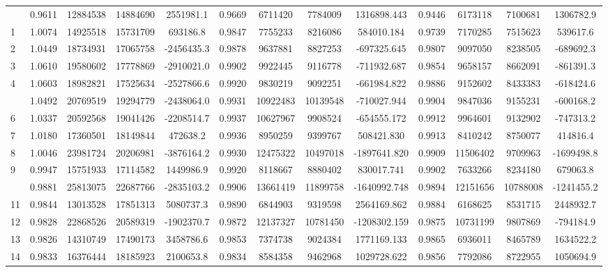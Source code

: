 \documentclass[
  12pt,
]{article}
\begin{document}
\begin{longtable}[t]{lcccccccccccc}
\endfoot
\bottomrule
\endlastfoot
0 & 0.9611 & 12884538 & 14884690 & 2551981.1 & 0.9669 & 6711420 & 7784009 & 1316898.443 & 0.9446 & 6173118 & 7100681 & 1306782.9\\
1 & 1.0074 & 14925518 & 15731709 & 693186.8 & 0.9847 & 7755233 & 8216086 & 584010.184 & 0.9739 & 7170285 & 7515623 & 539617.6\\
2 & 1.0449 & 18734931 & 17065758 & -2456435.3 & 0.9878 & 9637881 & 8827253 & -697325.645 & 0.9807 & 9097050 & 8238505 & -689692.3\\
3 & 1.0610 & 19580602 & 17778869 & -2910021.0 & 0.9902 & 9922445 & 9116778 & -711932.687 & 0.9854 & 9658157 & 8662091 & -861391.3\\
4 & 1.0603 & 18982821 & 17525634 & -2527866.6 & 0.9920 & 9830219 & 9092251 & -661984.822 & 0.9886 & 9152602 & 8433383 & -618424.6\\
\addlinespace
5 & 1.0492 & 20769519 & 19294779 & -2438064.0 & 0.9931 & 10922483 & 10139548 & -710027.944 & 0.9904 & 9847036 & 9155231 & -600168.2\\
6 & 1.0337 & 20592568 & 19041426 & -2208514.7 & 0.9937 & 10627967 & 9908524 & -654555.172 & 0.9912 & 9964601 & 9132902 & -747313.2\\
7 & 1.0180 & 17360501 & 18149844 & 472638.2 & 0.9936 & 8950259 & 9399767 & 508421.830 & 0.9913 & 8410242 & 8750077 & 414816.4\\
8 & 1.0046 & 23981724 & 20206981 & -3876164.2 & 0.9930 & 12475322 & 10497018 & -1897641.820 & 0.9909 & 11506402 & 9709963 & -1699498.8\\
9 & 0.9947 & 15751933 & 17114582 & 1449986.9 & 0.9920 & 8118667 & 8880402 & 830017.741 & 0.9902 & 7633266 & 8234180 & 679063.8\\
\addlinespace
10 & 0.9881 & 25813075 & 22687766 & -2835103.2 & 0.9906 & 13661419 & 11899758 & -1640992.748 & 0.9894 & 12151656 & 10788008 & -1241455.2\\
11 & 0.9844 & 13013528 & 17851313 & 5080737.3 & 0.9890 & 6844903 & 9319598 & 2564169.862 & 0.9884 & 6168625 & 8531715 & 2448932.7\\
12 & 0.9828 & 22868526 & 20589319 & -1902370.7 & 0.9872 & 12137327 & 10781450 & -1208302.159 & 0.9875 & 10731199 & 9807869 & -794184.9\\
13 & 0.9826 & 14310749 & 17490173 & 3458786.6 & 0.9853 & 7374738 & 9024384 & 1771169.133 & 0.9865 & 6936011 & 8465789 & 1634522.2\\
14 & 0.9833 & 16376444 & 18185923 & 2100653.8 & 0.9834 & 8584358 & 9462968 & 1029728.622 & 0.9856 & 7792086 & 8722955 & 1050694.9\\

\end{longtable}
\end{document}
